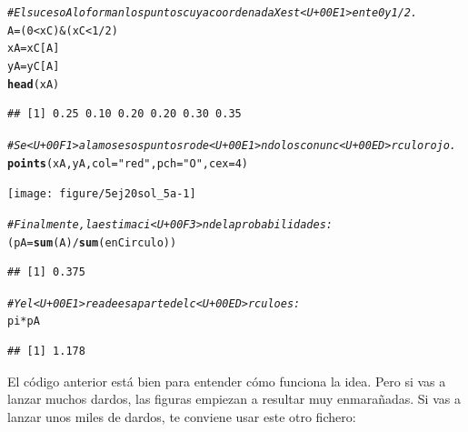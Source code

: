 \documentclass[10pt,a4paper]{article}\usepackage[]{graphicx}\usepackage[]{color}
\makeatletter
\newcommand{\hlnum}[1]{\textcolor[rgb]{0.686,0.059,0.569}{#1}}%
\newcommand{\hlstr}[1]{\textcolor[rgb]{0.192,0.494,0.8}{#1}}%
\newcommand{\hlcom}[1]{\textcolor[rgb]{0.678,0.584,0.686}{\textit{#1}}}%
\newcommand{\hlopt}[1]{\textcolor[rgb]{0,0,0}{#1}}%
\newcommand{\hlstd}[1]{\textcolor[rgb]{0.345,0.345,0.345}{#1}}%
\newcommand{\hlkwb}[1]{\textcolor[rgb]{0.69,0.353,0.396}{#1}}%
\newcommand{\hlkwc}[1]{\textcolor[rgb]{0.333,0.667,0.333}{#1}}%
\newcommand{\hlkwd}[1]{\textcolor[rgb]{0.737,0.353,0.396}{\textbf{#1}}}%
\newenvironment{kframe}{%
 \def\at@end@of@kframe{}%
 \ifinner\ifhmode%
  \def\at@end@of@kframe{\end{minipage}}%
  \begin{minipage}{\columnwidth}%
 \fi\fi%
 \def\FrameCommand##1{\hskip\@totalleftmargin \hskip-\fboxsep
 \colorbox{shadecolor}{##1}\hskip-\fboxsep
     \hskip-\linewidth \hskip-\@totalleftmargin \hskip\columnwidth}%
 \MakeFramed {\advance\hsize-\width
   \@totalleftmargin\z@ \linewidth\hsize
   \@setminipage}}%
 {\par\unskip\endMakeFramed%
 \at@end@of@kframe}
\newenvironment{knitrout}{}{} %
\makeatother
\begin{document}
\begin{enumerate}
\begin{knitrout}
\begin{kframe}
\begin{alltt}
\hlcom{# El suceso A lo forman los puntos cuya coordenada X est<U+00E1> ente 0 y 1/2.}
\hlstd{A} \hlkwb{=} \hlstd{(}\hlnum{0} \hlopt{<} \hlstd{xC)} \hlopt{&} \hlstd{(xC} \hlopt{<} \hlnum{1}\hlopt{/}\hlnum{2}\hlstd{)}
\hlstd{xA} \hlkwb{=}\hlstd{xC[A]}
\hlstd{yA} \hlkwb{=}\hlstd{yC[A]}
\hlkwd{head}\hlstd{(xA)}
\end{alltt}
\begin{verbatim}
## [1] 0.25 0.10 0.20 0.20 0.30 0.35
\end{verbatim}
\begin{alltt}
\hlcom{# Se<U+00F1>alamos esos puntos rode<U+00E1>ndolos con un c<U+00ED>rculo rojo.}
\hlkwd{points}\hlstd{(xA, yA,} \hlkwc{col}\hlstd{=}\hlstr{"red"}\hlstd{,} \hlkwc{pch}\hlstd{=}\hlstr{"O"}\hlstd{,} \hlkwc{cex}\hlstd{=}\hlnum{4}\hlstd{)}
\end{alltt}
\end{kframe}
\texttt{[image: figure/5ej20sol\_5a-1]} 
\begin{kframe}\begin{alltt}
\hlcom{# Finalmente, la estimaci<U+00F3>n de la probabilidad es:}
\hlstd{(pA} \hlkwb{=} \hlkwd{sum}\hlstd{(A)} \hlopt{/} \hlkwd{sum}\hlstd{(enCirculo))}
\end{alltt}
\begin{verbatim}
## [1] 0.375
\end{verbatim}
\begin{alltt}
\hlcom{# Y el <U+00E1>rea de esa parte del c<U+00ED>rculo es:}
\hlstd{pi} \hlopt{*} \hlstd{pA}
\end{alltt}
\begin{verbatim}
## [1] 1.178
\end{verbatim}
\end{kframe}
\end{knitrout}
  El código anterior está bien para entender cómo funciona la idea. Pero si vas a lanzar muchos dardos, las figuras empiezan a resultar muy enmarañadas. Si vas a lanzar unos miles de dardos, te conviene usar este otro fichero:
  \begin{center}
  \end{center}


\end{enumerate}
\end{document}
